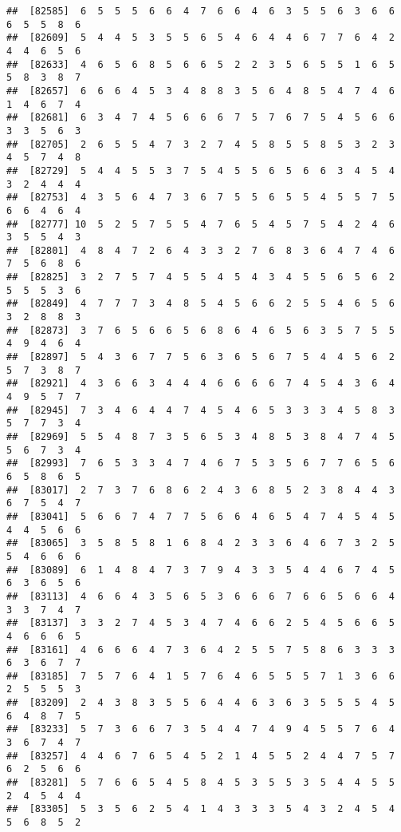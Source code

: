 \documentclass[
]{book}
\begin{document}
\begin{verbatim}
##  [82585]  6  5  5  5  6  6  4  7  6  6  4  6  3  5  5  6  3  6  6  6  5  5  8  6
##  [82609]  5  4  4  5  3  5  5  6  5  4  6  4  4  6  7  7  6  4  2  4  4  6  5  6
##  [82633]  4  6  5  6  8  5  6  6  5  2  2  3  5  6  5  5  1  6  5  5  8  3  8  7
##  [82657]  6  6  6  4  5  3  4  8  8  3  5  6  4  8  5  4  7  4  6  1  4  6  7  4
##  [82681]  6  3  4  7  4  5  6  6  6  7  5  7  6  7  5  4  5  6  6  3  3  5  6  3
##  [82705]  2  6  5  5  4  7  3  2  7  4  5  8  5  5  8  5  3  2  3  4  5  7  4  8
##  [82729]  5  4  4  5  5  3  7  5  4  5  5  6  5  6  6  3  4  5  4  3  2  4  4  4
##  [82753]  4  3  5  6  4  7  3  6  7  5  5  6  5  5  4  5  5  7  5  6  6  4  6  4
##  [82777] 10  5  2  5  7  5  5  4  7  6  5  4  5  7  5  4  2  4  6  3  5  5  4  3
##  [82801]  4  8  4  7  2  6  4  3  3  2  7  6  8  3  6  4  7  4  6  7  5  6  8  6
##  [82825]  3  2  7  5  7  4  5  5  4  5  4  3  4  5  5  6  5  6  2  5  5  5  3  6
##  [82849]  4  7  7  7  3  4  8  5  4  5  6  6  2  5  5  4  6  5  6  3  2  8  8  3
##  [82873]  3  7  6  5  6  6  5  6  8  6  4  6  5  6  3  5  7  5  5  4  9  4  6  4
##  [82897]  5  4  3  6  7  7  5  6  3  6  5  6  7  5  4  4  5  6  2  5  7  3  8  7
##  [82921]  4  3  6  6  3  4  4  4  6  6  6  6  7  4  5  4  3  6  4  4  9  5  7  7
##  [82945]  7  3  4  6  4  4  7  4  5  4  6  5  3  3  3  4  5  8  3  5  7  7  3  4
##  [82969]  5  5  4  8  7  3  5  6  5  3  4  8  5  3  8  4  7  4  5  5  6  7  3  4
##  [82993]  7  6  5  3  3  4  7  4  6  7  5  3  5  6  7  7  6  5  6  6  5  8  6  5
##  [83017]  2  7  3  7  6  8  6  2  4  3  6  8  5  2  3  8  4  4  3  6  7  5  4  7
##  [83041]  5  6  6  7  4  7  7  5  6  6  4  6  5  4  7  4  5  4  5  4  4  5  6  6
##  [83065]  3  5  8  5  8  1  6  8  4  2  3  3  6  4  6  7  3  2  5  5  4  6  6  6
##  [83089]  6  1  4  8  4  7  3  7  9  4  3  3  5  4  4  6  7  4  5  6  3  6  5  6
##  [83113]  4  6  6  4  3  5  6  5  3  6  6  6  7  6  6  5  6  6  4  3  3  7  4  7
##  [83137]  3  3  2  7  4  5  3  4  7  4  6  6  2  5  4  5  6  6  5  4  6  6  6  5
##  [83161]  4  6  6  6  4  7  3  6  4  2  5  5  7  5  8  6  3  3  3  6  3  6  7  7
##  [83185]  7  5  7  6  4  1  5  7  6  4  6  5  5  5  7  1  3  6  6  2  5  5  5  3
##  [83209]  2  4  3  8  3  5  5  6  4  4  6  3  6  3  5  5  5  4  5  6  4  8  7  5
##  [83233]  5  7  3  6  6  7  3  5  4  4  7  4  9  4  5  5  7  6  4  3  6  7  4  7
##  [83257]  4  4  6  7  6  5  4  5  2  1  4  5  5  2  4  4  7  5  7  6  2  5  6  6
##  [83281]  5  7  6  6  5  4  5  8  4  5  3  5  5  3  5  4  4  5  5  2  4  5  4  4
##  [83305]  5  3  5  6  2  5  4  1  4  3  3  3  5  4  3  2  4  5  4  5  6  8  5  2

\end{verbatim}
\end{document}
